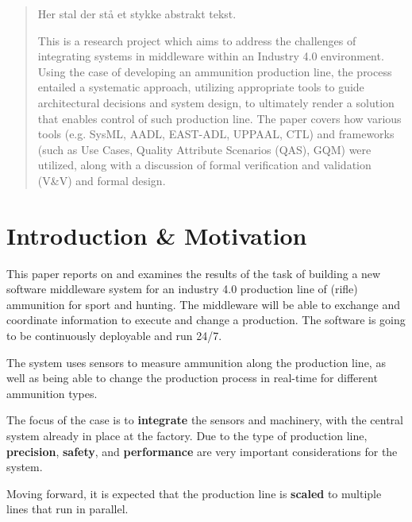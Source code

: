 
\begin{abstract}
Her stal der stå et stykke abstrakt tekst.

This is a research project which aims to address the challenges of integrating systems in middleware within an Industry 4.0 environment. Using the case of developing an ammunition production line, the process entailed a systematic approach, utilizing appropriate tools to guide architectural decisions and system design, to ultimately render a solution that enables control of such production line. The paper covers how various tools (e.g. SysML, AADL, EAST-ADL, UPPAAL, CTL) and frameworks (such as Use Cases, Quality Attribute Scenarios (QAS), GQM) were utilized, along with a discussion of formal verification and validation (V\&V) and formal design.

\end{abstract}

\section{Introduction \& Motivation}
\label{sec:introduction}


This paper reports on and examines the results of the task of building a new software middleware system for an industry 4.0 production line of (rifle) ammunition for sport and hunting. The middleware will be able to exchange and coordinate information to execute and change a production. The software is going to be continuously deployable and run 24/7.

The system uses sensors to measure ammunition along the production line, as well as being able to change the production process in real-time for different ammunition types.

The focus of the case is to \textbf{integrate} the sensors and machinery, with the central system already in place at the factory. Due to the type of production line, \textbf{precision}, \textbf{safety}, 
and \textbf{performance} are very important considerations for the system.  

Moving forward, it is expected that the production line is \textbf{scaled} to multiple lines that run in parallel.

